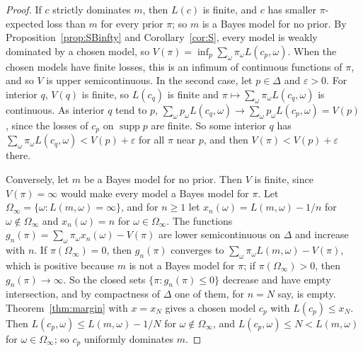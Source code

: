 \documentclass[11pt]{article}
\theoremstyle{definition}
\theoremstyle{remark}
\newcommand{\supp}{\operatorname{supp}}
\begin{document}
\begin{proof}
If $c$ strictly dominates $m$, then $L(c)$ is finite, and $c$ has smaller $\pi$-expected loss than $m$ for every prior $\pi$; so $m$ is a Bayes model for no prior. By Proposition~\ref{prop:SBinfty} and Corollary~\ref{cor:S}, every model is weakly dominated by a chosen model, so $V(\pi)=\inf_p\sum_\omega\pi_\omega L(c_p,\omega)$. When the chosen models have finite losses, this is an infimum of continuous functions of $\pi$, and so $V$ is upper semicontinuous. In the second case, let $p\in\Delta$ and $\varepsilon>0$. For interior $q$, $V(q)$ is finite, so $L(c_q)$ is finite and $\pi\mapsto\sum_\omega\pi_\omega L(c_q,\omega)$ is continuous. As interior $q$ tend to $p$, $\sum_\omega p_\omega L(c_q,\omega)\to\sum_\omega p_\omega L(c_p,\omega)=V(p)$, since the losses of $c_p$ on $\supp p$ are finite. So some interior $q$ has $\sum_\omega\pi_\omega L(c_q,\omega)<V(p)+\varepsilon$ for all $\pi$ near $p$, and then $V(\pi)<V(p)+\varepsilon$ there.

Conversely, let $m$ be a Bayes model for no prior. Then $V$ is finite, since $V(\pi)=\infty$ would make every model a Bayes model for $\pi$. Let $\Omega_\infty=\{\omega:L(m,\omega)=\infty\}$, and for $n\ge1$ let $x_n(\omega)=L(m,\omega)-1/n$ for $\omega\notin\Omega_\infty$ and $x_n(\omega)=n$ for $\omega\in\Omega_\infty$. The functions $g_n(\pi)=\sum_\omega\pi_\omega x_n(\omega)-V(\pi)$ are lower semicontinuous on $\Delta$ and increase with $n$. If $\pi(\Omega_\infty)=0$, then $g_n(\pi)$ converges to $\sum_\omega\pi_\omega L(m,\omega)-V(\pi)$, which is positive because $m$ is not a Bayes model for $\pi$; if $\pi(\Omega_\infty)>0$, then $g_n(\pi)\to\infty$. So the closed sets $\{\pi:g_n(\pi)\le0\}$ decrease and have empty intersection, and by compactness of $\Delta$ one of them, for $n=N$ say, is empty. Theorem~\ref{thm:margin} with $x=x_N$ gives a chosen model $c_p$ with $L(c_p)\le x_N$. Then $L(c_p,\omega)\le L(m,\omega)-1/N$ for $\omega\notin\Omega_\infty$, and $L(c_p,\omega)\le N<L(m,\omega)$ for $\omega\in\Omega_\infty$; so $c_p$ uniformly dominates $m$.
\end{proof}
\end{document}
